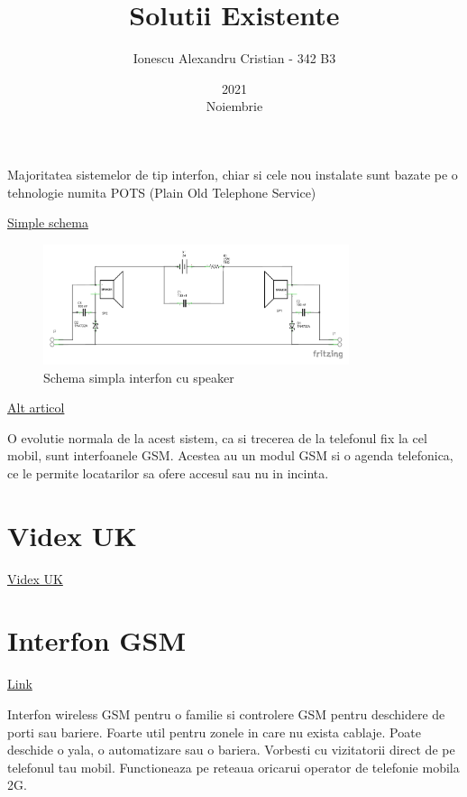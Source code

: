 \documentclass[12pt,english]{article}
\title{Solutii Existente}
\date{2021\\ Noiembrie}
\author{Ionescu Alexandru Cristian - 342 B3}
\begin{document}
\maketitle
\newpage

\tableofcontents
\newpage

Majoritatea sistemelor de tip interfon, chiar si cele nou instalate sunt bazate pe o tehnologie numita POTS (Plain Old Telephone Service)

\href{https://www.epanorama.net/documents/telecom/telephone_intercom.html}{Simple schema}

\begin{figure}[h]
  \centering
  \includegraphics[width=0.8\textwidth]{interfon_schem.pdf}
  \caption{Schema simpla interfon cu speaker}
\end{figure}

\href{https://www.nextiva.com/blog/what-is-pots.html}{Alt articol}

O evolutie normala de la acest sistem, ca si trecerea de la telefonul fix la cel mobil, sunt interfoanele GSM. Acestea au un modul GSM si o agenda telefonica, ce le permite locatarilor sa ofere accesul sau nu in incinta.

\section {Videx UK}

\href{https://www.videxuk.com/system/gsm-intercoms/}{Videx UK}

\section {Interfon GSM}

\href{https://www.a2t.ro/interfoane-videointerfoane/interfon-wireless-gsm-pentru-o-familie.html}{Link}

Interfon wireless GSM pentru o familie si controlere GSM pentru deschidere de porti sau bariere. Foarte util pentru zonele in care nu exista cablaje. Poate deschide o yala, o automatizare sau o bariera. Vorbesti cu vizitatorii direct de pe telefonul tau mobil. Functioneaza pe reteaua oricarui operator de telefonie mobila 2G.
\end{document}
